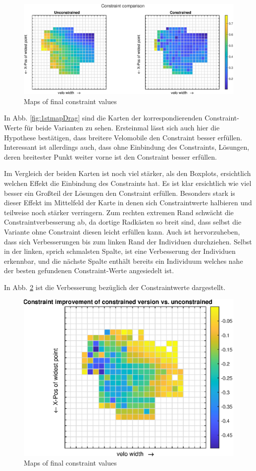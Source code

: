 \begin{figure}[h]
	\includegraphics[width=1\linewidth]{bilder/2pt500Samples/constraintMapComparison}
	\caption{Maps of final constraint values}
	\label{fig:1stmapCon}
\end{figure}

In Abb. \ref{fig:1stmapDrag} sind die Karten der korrespondierenden Constraint-Werte für beide Varianten zu sehen.
Ersteinmal lässt sich auch hier die Hypothese bestätigen, dass breitere Velomobile den Constraint besser erfüllen.
Interessant ist allerdings auch, dass ohne Einbindung des Constraints, Lösungen, deren breitester Punkt weiter vorne ist den Constraint besser erfüllen.

Im Vergleich der beiden Karten ist noch viel stärker, als den Boxplots, ersichtlich welchen Effekt die Einbindung des Constraints hat.
Es ist klar ersichtlich wie viel besser ein Großteil der Lösungen den Constraint erfüllen.
Besonders stark is dieser Effekt im Mittelfeld der Karte in denen sich Constraintwerte halbieren und teilweise noch stärker verringern.
Zum rechten extremen Rand schwächt die Constraintverbesserung ab, da dortige Radkästen so breit sind, dass selbst die Variante ohne Constraint diesen leicht erfüllen kann.
Auch ist hervorzuheben, dass sich Verbesserungen bis zum linken Rand der Individuen durchziehen.
Selbst in der linken, sprich schmalsten Spalte, ist eine Verbesserung der Individuen erkennbar, und die nächste Spalte enthält bereits ein Individuum welches nahe der besten gefundenen Constraint-Werte angesiedelt ist.

In Abb. \ref{fig:1stmapConCompare} ist die Verbesserung bezüglich der Constraintwerte dargestellt.
\begin{figure}[h]
	\centering
	\includegraphics[width=.7\linewidth]{bilder/2pt500Samples/constraintImprovements}
	\caption{Maps of final constraint values}
	\label{fig:1stmapConCompare}
\end{figure}


